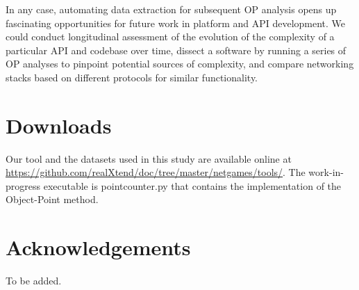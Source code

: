\documentclass[conference]{IEEEtran}
\begin{document}
In any case, automating data extraction for subsequent OP analysis
opens up fascinating opportunities for future work in platform and API
development. We could conduct longitudinal assessment of the evolution
of the complexity of a particular API and codebase over time, dissect
a software by running a series of OP analyses to pinpoint potential
sources of complexity, and compare networking stacks based on
different protocols for similar functionality.


\section{Downloads%
  \label{downloads}%
}

Our tool and the datasets used in this study are available online at
\url{https://github.com/realXtend/doc/tree/master/netgames/tools/}. The
work-in-progress executable is pointcounter.py that contains the
implementation of the Object-Point method.

\section*{Acknowledgements}

To be added.


\end{document}
